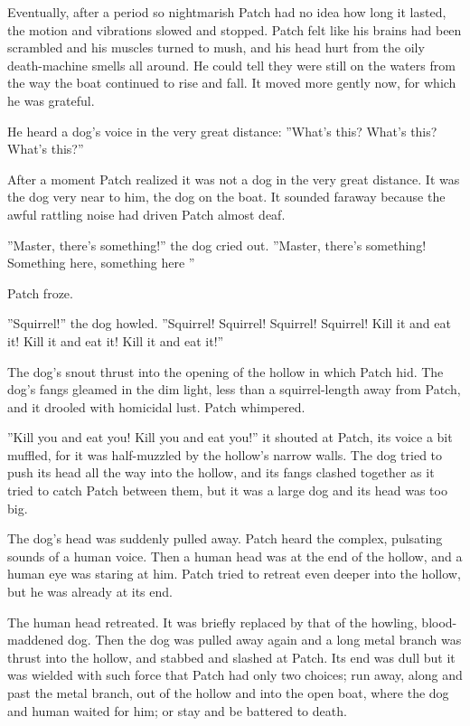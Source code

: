 \documentclass[12pt]{book}
\begin{document}
 Eventually, after a period so nightmarish Patch had no idea how long it lasted, the motion and vibrations slowed and stopped. Patch felt like his brains had been scrambled and his muscles turned to mush, and his head hurt from the oily death-machine smells all around. He could tell they were still on the waters from the way the boat continued to rise and fall. It moved more gently now, for which he was grateful.\par
 He heard a dog's voice in the very great distance: ''What's this? What's this? What's this?''\par
 After a moment Patch realized it was not a dog in the very great distance. It was the dog very near to him, the dog on the boat. It sounded faraway because the awful rattling noise had driven Patch almost deaf.\par
 ''Master, there's something!'' the dog cried out. ''Master, there's something! Something here, something here %
 ''\par
Patch froze.\par
''Squirrel!'' the dog howled. ''Squirrel! Squirrel! Squirrel! Squirrel! Kill it and eat it! Kill it and eat it! Kill it and eat it!''\par
 The dog's snout thrust into the opening of the hollow in which Patch hid. The dog's fangs gleamed in the dim light, less than a squirrel-length away from Patch, and it drooled with homicidal lust. Patch whimpered.\par
 ''Kill you and eat you! Kill you and eat you!'' it shouted at Patch, its voice a bit muffled, for it was half-muzzled by the hollow's narrow walls. The dog tried to push its head all the way into the hollow, and its fangs clashed together as it tried to catch Patch between them, but it was a large dog and its head was too big.\par
 The dog's head was suddenly pulled away. Patch heard the complex, pulsating sounds of a human voice. Then a human head was at the end of the hollow, and a human eye was staring at him. Patch tried to retreat even deeper into the hollow, but he was already at its end.\par
 The human head retreated. It was briefly replaced by that of the howling, blood-maddened dog. Then the dog was pulled away again %
 and a long metal branch was thrust into the hollow, and stabbed and slashed at Patch. Its end was dull but it was wielded with such force that Patch had only two choices; run away, along and past the metal branch, out of the hollow and into the open boat, where the dog and human waited for him; or stay and be battered to death.\par
\end{document}

